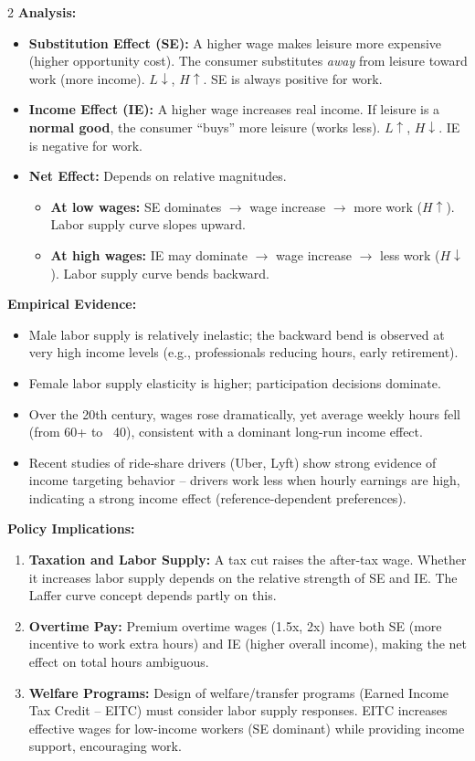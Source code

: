 \documentclass[10pt,a4paper]{article}
\begin{document}
\begin{multicols}{2}
\textbf{Analysis:}
\begin{itemize}[leftmargin=*,nosep]
    \item \textbf{Substitution Effect (SE):} A higher wage makes leisure more expensive (higher opportunity cost). The consumer substitutes \textit{away} from leisure toward work (more income). $L \downarrow$, $H \uparrow$. SE is always positive for work.
    \item \textbf{Income Effect (IE):} A higher wage increases real income. If leisure is a \textbf{normal good}, the consumer ``buys'' more leisure (works less). $L \uparrow$, $H \downarrow$. IE is negative for work.
    \item \textbf{Net Effect:} Depends on relative magnitudes.
    \begin{itemize}[nosep]
        \item \textbf{At low wages:} SE dominates $\to$ wage increase $\to$ more work ($H \uparrow$). Labor supply curve slopes upward.
        \item \textbf{At high wages:} IE may dominate $\to$ wage increase $\to$ less work ($H \downarrow$). Labor supply curve bends backward.
    \end{itemize}
\end{itemize}

\textbf{Empirical Evidence:}
\begin{itemize}[leftmargin=*,nosep]
    \item Male labor supply is relatively inelastic; the backward bend is observed at very high income levels (e.g., professionals reducing hours, early retirement).
    \item Female labor supply elasticity is higher; participation decisions dominate.
    \item Over the 20th century, wages rose dramatically, yet average weekly hours fell (from 60+ to ~40), consistent with a dominant long-run income effect.
    \item Recent studies of ride-share drivers (Uber, Lyft) show strong evidence of income targeting behavior -- drivers work less when hourly earnings are high, indicating a strong income effect (reference-dependent preferences).
\end{itemize}

\textbf{Policy Implications:}
\begin{enumerate}[leftmargin=*,nosep]
    \item \textbf{Taxation and Labor Supply:} A tax cut raises the after-tax wage. Whether it increases labor supply depends on the relative strength of SE and IE. The Laffer curve concept depends partly on this.
    \item \textbf{Overtime Pay:} Premium overtime wages (1.5x, 2x) have both SE (more incentive to work extra hours) and IE (higher overall income), making the net effect on total hours ambiguous.
    \item \textbf{Welfare Programs:} Design of welfare/transfer programs (Earned Income Tax Credit -- EITC) must consider labor supply responses. EITC increases effective wages for low-income workers (SE dominant) while providing income support, encouraging work.
\end{enumerate}


\end{multicols}
\end{document}
